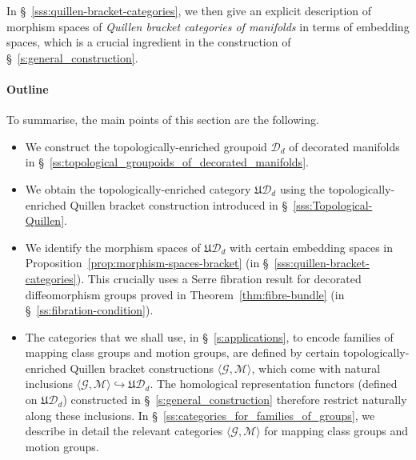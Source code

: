 \documentclass[AHL,Unicode,published]{cedram}
\newcommand{\fU}{\ensuremath{\mathfrak{U}}}
\newcommand{\cD}{\mathcal{D}}
\newcommand{\cG}{\mathcal{G}}
\newcommand{\cM}{\mathcal{M}}
\begin{document}
In \S~\ref{sss:quillen-bracket-categories}, we then give an explicit description of morphism spaces of \emph{Quillen bracket categories of manifolds} in terms of embedding spaces, which is a crucial ingredient in the construction of \S~\ref{s:general_construction}.


\paragraph*{Outline}
To summarise, the main points of this section are the following.
\begin{itemize}
\item We construct the topologically-enriched groupoid $\cD_{d}$ of decorated manifolds in \S~\ref{ss:topological_groupoids_of_decorated_manifolds}.
\item We obtain the topologically-enriched category $\fU\cD_{d}$ using the topologically-enriched Quillen bracket construction introduced in \S~\ref{sss:Topological-Quillen}.
\item We identify the morphism spaces of $\fU\cD_{d}$ with certain embedding spaces in Proposition~\ref{prop:morphism-spaces-bracket} (in \S~\ref{sss:quillen-bracket-categories}). This crucially uses a Serre fibration result for decorated diffeomorphism groups proved in Theorem~\ref{thm:fibre-bundle} (in \S~\ref{ss:fibration-condition}).
\item The categories that we shall use, in \S~\ref{s:applications}, to encode families of mapping class groups and motion groups, are defined by certain topologically-enriched Quillen bracket constructions $\langle \cG,\cM\rangle$, which come with natural inclusions $\langle \cG,\cM\rangle \hookrightarrow \fU\cD_{d}$. The homological representation functors (defined on $\fU\cD_{d}$) constructed in \S~\ref{s:general_construction} therefore restrict naturally along these inclusions. In \S~\ref{ss:categories_for_families_of_groups}, we describe in detail the relevant categories $\langle \cG,\cM\rangle$ for mapping class groups and motion groups.
\end{itemize}
\end{document}

